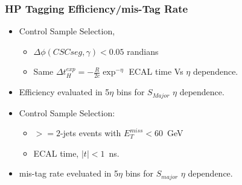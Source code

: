 \documentclass{beamer}
\begin{document}
\begin{frame}
\frametitle{HP Tagging Efficiency/mis-Tag Rate}
   \begin{minipage}[t]{\linewidth}
     \begin{tcolorbox}[colback=UNL@Cream!5,colframe=UMN@Maroon!40,title=\textcolor{black}{\textbf{Halo Photon Tagging Efficiency}}]
        \begin{itemize}
         \item Control Sample Selection,
           \begin{itemize}
            \item $\Delta\phi(CSC seg, \gamma) < 0.05$ randians
            \item Same $ \Delta t^{exp}_{H}= -\frac{R}{2c}\exp^{-\eta} $ ECAL time Vs $\eta$ dependence.
           \end{itemize}
         \item Efficiency evaluated in 5$\eta$ bins for $S_{Major}$ $\eta$ dependence.
        \end{itemize}
      \end{tcolorbox} 
   \end{minipage}
   \begin{minipage}[t]{\linewidth} 
     \begin{tcolorbox}[colback=UNL@Cream!5,colframe=UMN@Maroon!40,title=\textcolor{black}{\textbf{Halo Photon mis-Tag Rate}}]
      \begin{itemize}
         \item Control Sample Selection:
           \begin{itemize}
            \item $ >= 2$-jets events with $E^{miss}_{T} < 60$~GeV
            \item ECAL time, $|t| < 1$~ns.
           \end{itemize}
          \item mis-tag rate eveluated in 5$\eta$ bins for $S_{major}$ $\eta$ dependence.         
        \end{itemize}
      \end{tcolorbox}
  \end{minipage}
\end{frame}
\end{document}
